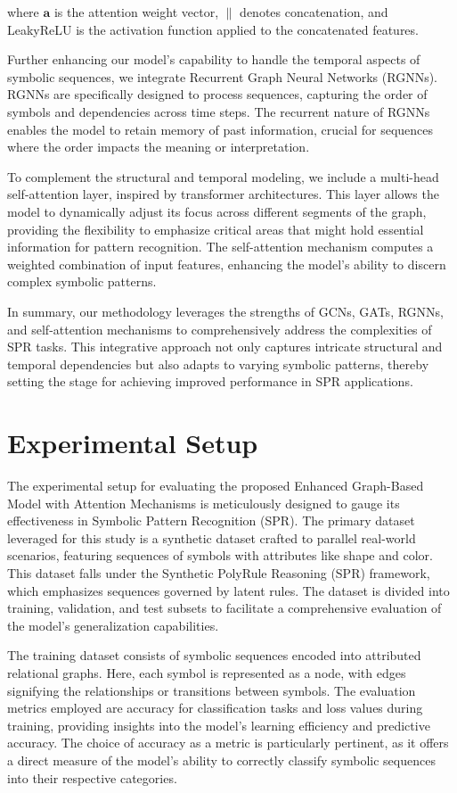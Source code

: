 \documentclass{article}
\begin{document}
where \(\mathbf{a}\) is the attention weight vector, \(\parallel\) denotes concatenation, and LeakyReLU is the activation function applied to the concatenated features.

Further enhancing our model's capability to handle the temporal aspects of symbolic sequences, we integrate Recurrent Graph Neural Networks (RGNNs). RGNNs are specifically designed to process sequences, capturing the order of symbols and dependencies across time steps. The recurrent nature of RGNNs enables the model to retain memory of past information, crucial for sequences where the order impacts the meaning or interpretation.

To complement the structural and temporal modeling, we include a multi-head self-attention layer, inspired by transformer architectures. This layer allows the model to dynamically adjust its focus across different segments of the graph, providing the flexibility to emphasize critical areas that might hold essential information for pattern recognition. The self-attention mechanism computes a weighted combination of input features, enhancing the model's ability to discern complex symbolic patterns.

In summary, our methodology leverages the strengths of GCNs, GATs, RGNNs, and self-attention mechanisms to comprehensively address the complexities of SPR tasks. This integrative approach not only captures intricate structural and temporal dependencies but also adapts to varying symbolic patterns, thereby setting the stage for achieving improved performance in SPR applications.

\section{Experimental Setup}
The experimental setup for evaluating the proposed Enhanced Graph-Based Model with Attention Mechanisms is meticulously designed to gauge its effectiveness in Symbolic Pattern Recognition (SPR). The primary dataset leveraged for this study is a synthetic dataset crafted to parallel real-world scenarios, featuring sequences of symbols with attributes like shape and color. This dataset falls under the Synthetic PolyRule Reasoning (SPR) framework, which emphasizes sequences governed by latent rules. The dataset is divided into training, validation, and test subsets to facilitate a comprehensive evaluation of the model's generalization capabilities.

The training dataset consists of symbolic sequences encoded into attributed relational graphs. Here, each symbol is represented as a node, with edges signifying the relationships or transitions between symbols. The evaluation metrics employed are accuracy for classification tasks and loss values during training, providing insights into the model’s learning efficiency and predictive accuracy. The choice of accuracy as a metric is particularly pertinent, as it offers a direct measure of the model's ability to correctly classify symbolic sequences into their respective categories.
\end{document}
